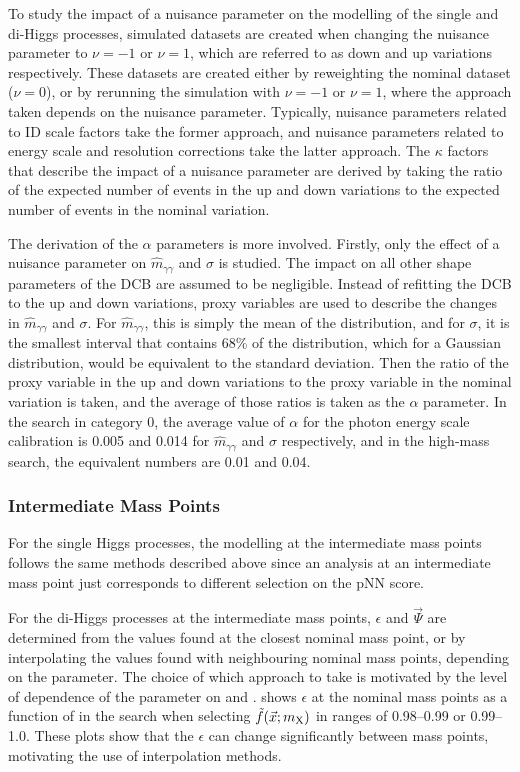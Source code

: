 To study the impact of a nuisance parameter on the modelling of the single and di-Higgs processes, simulated datasets are created when changing the nuisance parameter to $\nu=-1$ or $\nu=1$, which are referred to as down and up variations respectively. These datasets are created either by reweighting the nominal dataset ($\nu=0$), or by rerunning the simulation with $\nu=-1$ or $\nu=1$, where the approach taken depends on the nuisance parameter. Typically, nuisance parameters related to ID scale factors take the former approach, and nuisance parameters related to energy scale and resolution corrections take the latter approach. The $\kappa$ factors that describe the impact of a nuisance parameter are derived by taking the ratio of the expected number of events in the up and down variations to the expected number of events in the nominal variation. 

The derivation of the $\alpha$ parameters is more involved. Firstly, only the effect of a nuisance parameter on $\hat{m}_{\gamma\gamma}$ and $\sigma$ is studied. The impact on all other shape parameters of the DCB are assumed to be negligible. Instead of refitting the DCB to the up and down variations, proxy variables are used to describe the changes in $\hat{m}_{\gamma\gamma}$ and $\sigma$. For $\hat{m}_{\gamma\gamma}$, this is simply the mean of the \mgg distribution, and for $\sigma$, it is the smallest \mgg interval that contains 68\% of the distribution, which for a Gaussian distribution, would be equivalent to the standard deviation. Then the ratio of the proxy variable in the up and down variations to the proxy variable in the nominal variation is taken, and the average of those ratios is taken as the $\alpha$ parameter. In the \XTwoHH search in category 0, the average value of $\alpha$ for the photon energy scale calibration is 0.005 and 0.014 for $\hat{m}_{\gamma\gamma}$ and $\sigma$ respectively, and in the high-mass \XYggHtt search, the equivalent numbers are 0.01 and 0.04. 

\subsubsection{Intermediate Mass Points}\label{sec:modelling_intermediate_mass_points}
For the single Higgs processes, the modelling at the intermediate mass points follows the same methods described above since an analysis at an intermediate mass point just corresponds to different selection on the pNN score. 

For the di-Higgs processes at the intermediate mass points, $\epsilon$ and $\vec{\Psi}$ are determined from the values found at the closest nominal mass point, or by interpolating the values found with neighbouring nominal mass points, depending on the parameter. The choice of which approach to take is motivated by the level of dependence of the parameter on \mX and \mY.  shows $\epsilon$ at the nominal mass points as a function of \mX in the \XTwoHH search when selecting $\tilde{f}(\vec{x};m_{\mathrm{X}})$ in ranges of 0.98--0.99 or 0.99--1.0. These plots show that the $\epsilon$ can change significantly between mass points, motivating the use of interpolation methods. 

